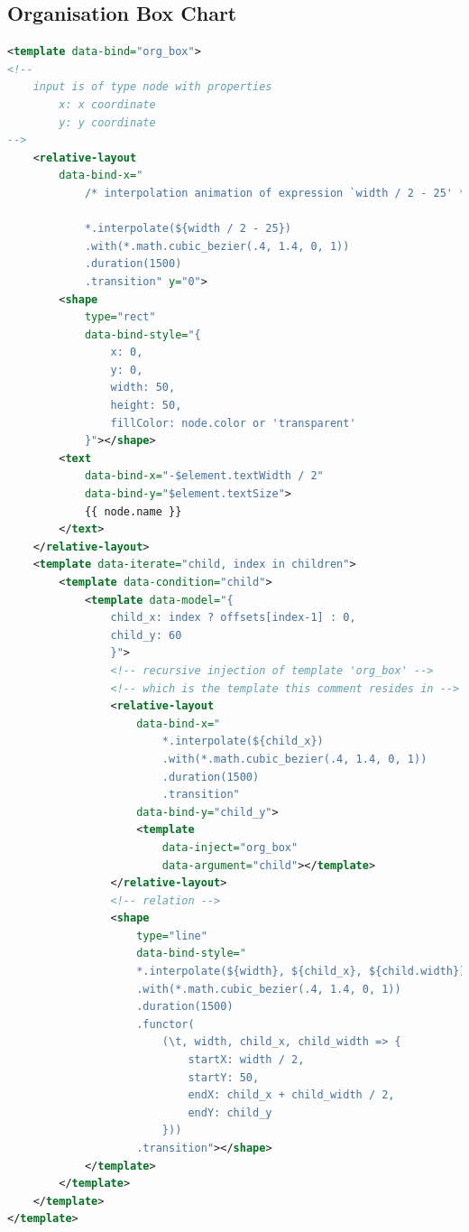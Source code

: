 \documentclass[11pt, a4paper]{report}
\begin{document}
\subsection{Organisation Box Chart}
\label{sec:appendix:org_box}
\begin{lstlisting}[language=xml]
<template data-bind="org_box">
<!--
	input is of type node with properties
		x: x coordinate
		y: y coordinate
-->
	<relative-layout
		data-bind-x="
			/* interpolation animation of expression `width / 2 - 25' */

			*.interpolate(${width / 2 - 25})
			.with(*.math.cubic_bezier(.4, 1.4, 0, 1))
			.duration(1500)
			.transition" y="0">
		<shape
			type="rect"
			data-bind-style="{
				x: 0,
				y: 0,
				width: 50,
				height: 50,
				fillColor: node.color or 'transparent'
			}"></shape>
		<text
			data-bind-x="-$element.textWidth / 2"
			data-bind-y="$element.textSize">
			{{ node.name }}
		</text>
	</relative-layout>
	<template data-iterate="child, index in children">
		<template data-condition="child">
			<template data-model="{
				child_x: index ? offsets[index-1] : 0,
				child_y: 60
				}">
				<!-- recursive injection of template 'org_box' -->
				<!-- which is the template this comment resides in -->
				<relative-layout
					data-bind-x="
						*.interpolate(${child_x})
						.with(*.math.cubic_bezier(.4, 1.4, 0, 1))
						.duration(1500)
						.transition"
					data-bind-y="child_y">
					<template
						data-inject="org_box"
						data-argument="child"></template>
				</relative-layout>
				<!-- relation -->
				<shape
					type="line"
					data-bind-style="
					*.interpolate(${width}, ${child_x}, ${child.width})
					.with(*.math.cubic_bezier(.4, 1.4, 0, 1))
					.duration(1500)
					.functor(
						(\t, width, child_x, child_width => {
							startX: width / 2,
							startY: 50,
							endX: child_x + child_width / 2,
							endY: child_y
						}))
					.transition"></shape>
			</template>
		</template>
	</template>
</template>
\end{lstlisting}
\end{document}
